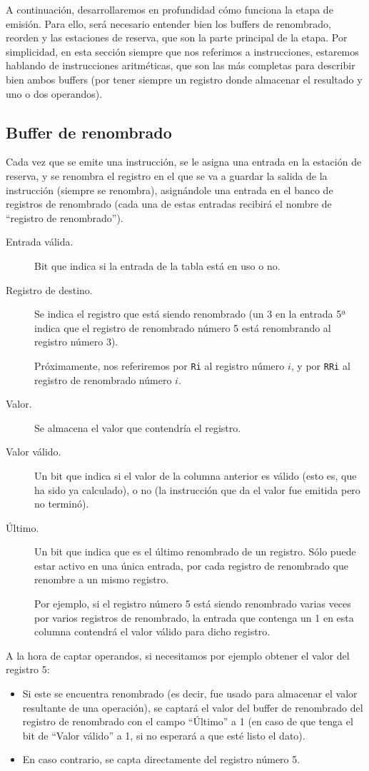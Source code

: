 A continuación, desarrollaremos en profundidad cómo funciona la etapa de emisión. Para ello, será necesario entender bien los buffers de renombrado, reorden y las estaciones de reserva, que son la parte principal de la etapa. Por simplicidad, en esta sección siempre que nos referimos a instrucciones, estaremos hablando de instrucciones aritméticas, que son las más completas para describir bien ambos buffers (por tener siempre un registro donde almacenar el resultado y uno o dos operandos).

\subsection{Buffer de renombrado}
Cada vez que se emite una instrucción, se le asigna una entrada en la estación de reserva, y se renombra el registro en el que se va a guardar la salida de la instrucción (siempre se renombra), asignándole una entrada en el banco de registros de renombrado (cada una de estas entradas recibirá el nombre de ``registro de renombrado'').

\begin{description}
    \item [Entrada válida.] Bit que indica si la entrada de la tabla está en uso o no.
    \item [Registro de destino.] Se indica el registro que está siendo renombrado (un 3 en la entrada 5ª indica que el registro de renombrado número 5 está renombrando al registro número 3).

        Próximamente, nos referiremos por \verb|Ri| al registro número $i$, y por \verb|RRi| al registro de renombrado número $i$.
    \item [Valor.] Se almacena el valor que contendría el registro.
    \item [Valor válido.] Un bit que indica si el valor de la columna anterior es válido (esto es, que ha sido ya calculado), o no (la instrucción que da el valor fue emitida pero no terminó).
    \item [Último.] Un bit que indica que es el último renombrado de un registro. Sólo puede estar activo en una única entrada, por cada registro de renombrado que renombre a un mismo registro.

        Por ejemplo, si el registro número 5 está siendo renombrado varias veces por varios registros de renombrado, la entrada que contenga un 1 en esta columna contendrá el valor válido para dicho registro.
\end{description}
A la hora de captar operandos, si necesitamos por ejemplo obtener el valor del registro 5: 
\begin{itemize}
    \item Si este se encuentra renombrado (es decir, fue usado para almacenar el valor resultante de una operación), se captará el valor del buffer de renombrado del registro de renombrado con el campo ``Último'' a 1 (en caso de que tenga el bit de ``Valor válido'' a 1, si no esperará a que esté listo el dato).
    \item En caso contrario, se capta directamente del registro número 5.
\end{itemize}

